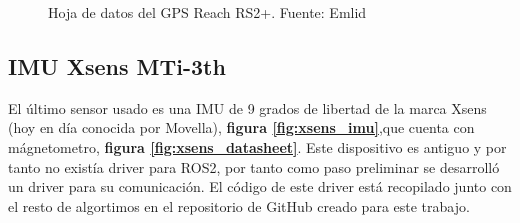 \begin{figure}[htbp]
\begin{minipage}[b]{0.5\textwidth}
    \caption{Hoja de datos del GPS Reach RS2+. Fuente: Emlid}
    \label{fig:datasheet_reach}
  \end{minipage}
\end{figure}



\subsection{IMU Xsens MTi-3th}

El último sensor usado es una IMU de 9 grados de libertad de la marca Xsens (hoy en día conocida por Movella), 
\textbf{figura \ref{fig:xsens_imu}},que cuenta con mágnetometro, \textbf{figura \ref{fig:xsens_datasheet}}. Este dispositivo es antiguo y por tanto 
no existía driver para ROS2, por tanto como paso preliminar se desarrolló un driver para su comunicación. El código de este driver está recopilado junto 
con el resto de algortimos en el repositorio de GitHub creado para este trabajo.

